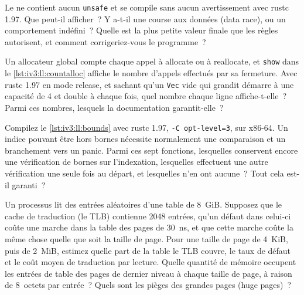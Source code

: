 \begin{question}\label{iq:iv3:low-latency:16}
Le  ne contient aucun \texttt{unsafe} et se compile sans aucun avertissement avec rustc 1.97. Que peut-il afficher~? Y a-t-il une course aux données (data race), ou un comportement indéfini~? Quelle est la plus petite valeur finale que les règles autorisent, et comment corrigeriez-vous le programme~?
\label{lst:iv3:ll:lost}
\end{question}

\begin{question}\label{iq:iv3:low-latency:17}
Un allocateur global compte chaque appel à allocate ou à reallocate, et \texttt{show} dans le \cref{lst:iv3:ll:countalloc} affiche le nombre d'appels effectués par sa fermeture. Avec rustc 1.97 en mode release, et sachant qu'un \texttt{Vec} vide qui grandit démarre à une capacité de 4 et double à chaque fois, quel nombre chaque ligne affiche-t-elle~? Parmi ces nombres, lesquels la documentation garantit-elle~?
\label{lst:iv3:ll:countalloc}
\end{question}

\begin{question}\label{iq:iv3:low-latency:18}
Compilez le \cref{lst:iv3:ll:bounds} avec rustc 1.97, \texttt{-C opt-level=3}, sur x86-64. Un indice pouvant être hors bornes nécessite normalement une comparaison et un branchement vers un panic. Parmi ces sept fonctions, lesquelles conservent encore une vérification de bornes sur l'indexation, lesquelles effectuent une autre vérification une seule fois au départ, et lesquelles n'en ont aucune~? Tout cela est-il garanti~?
\label{lst:iv3:ll:bounds}
\end{question}

\begin{question}\label{iq:iv3:low-latency:19}
Un processus lit des entrées aléatoires d'une table de 8~GiB. Supposez que le cache de traduction (le TLB) contienne 2048 entrées, qu'un défaut dans celui-ci coûte une marche dans la table des pages de 30~ns, et que cette marche coûte la même chose quelle que soit la taille de page. Pour une taille de page de 4~KiB, puis de 2~MiB, estimez quelle part de la table le TLB couvre, le taux de défaut et le coût moyen de traduction par lecture. Quelle quantité de mémoire occupent les entrées de table des pages de dernier niveau à chaque taille de page, à raison de 8~octets par entrée~? Quels sont les pièges des grandes pages (huge pages)~?
\end{question}

